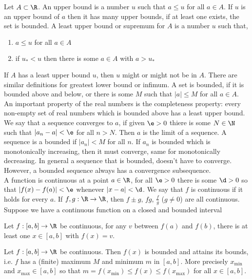 \noindent
Let $A \subset \R$. An upper bound is a number $u$ such that $a \le u$ for all $a \in A$. If $u$ is an upper bound of $a$ then it has many upper bounds, if at least one exists, the set is bounded. A least upper bound or supremum for $A$ is a number $u$ such that,
\begin{enumerate}
  \item $a \le u$ for all $a \in A$
  \item if $u_* < u$ then there is some $a \in A$ with $a > u_*$
\end{enumerate}
If $A$ has a least upper bound $u$, then $u$ might or might not be in $A$. There are similar definitions for greatest lower bound or infimum. A set is bounded, if it is bounded above and below, or there is some $M$ such that $|a| \le M$ for all $a \in A$. An important property of the real numbers is the completeness property: every non-empty set of real numbers which is bounded above has a least upper bound.\\

We say that a sequence converges to $a$, if given $\e > 0$ thiere is some $N \in \N$ such that $|a_n - a| < \e$ for all $n > N$. Then $a$ is the limit of a sequence. A sequence is a bounded if $|a_n| < M$ for all $n$. If $a_n$ is bounded which is monotonically increasing, then it must converge, same for monotonically decreasing. In general a sequence that is bounded, doesn't have to converge. However, a bounded sequence always has a convergence subsequence. \\

\noindent
A function is continuous at a point $a \in \R$, for all $\e > 0$ there is some $\d > 0$ so that $|f(x) - f(a)| < \e$ whenever $|x - a| < \d$. We say that $f$ is continuous if it holds for every $a$. If $f, g : \R \to \R$, then $f \pm g$, $fg$, $\frac{f}{g}$ ($g \ne 0$) are all continuous. Suppose we have a continuous function on a closed and bounded interval
\begin{nthm}
  Let $f: [a, b] \to \R$ be continuous, for any $v$ between $f(a)$ and $f(b)$, there is at least one $x \in [a, b]$ with $f(x) = v$.
\end{nthm}

\begin{nthm}
  Let $f: [a, b] \to \R$ be continuous. Then $f(x)$ is bounded and attains its bounds, i.e. $f$ has a (finite) maximum $M$ and minimum $m$ in $[a, b]$. More precisely $x_{\text{min}}$ and $x_{\text{max}} \in [a, b]$ so that $m = f(x_{\text{min}}) \le f(x) \le f(x_{\text{max}})$ for all $x \in [a, b]$.
\end{nthm}


